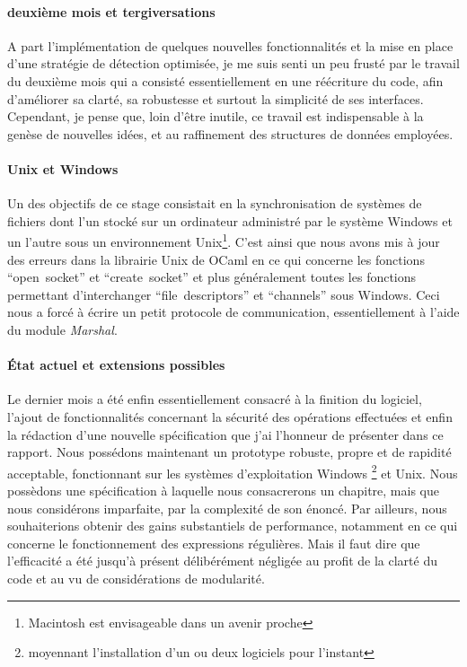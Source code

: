 \documentclass[11pt]{report}
\begin{document}
\paragraph{deuxi\`eme mois et tergiversations\\}
A part l'impl\'ementation de quelques nouvelles fonctionnalit\'es et la mise
en place d'une strat\'egie de d\'etection optimis\'ee, je me suis senti un 
peu frust\'e par le travail du deuxi\`eme mois qui
a consist\'e essentiellement en une r\'e\'ecriture du code, afin d'am\'eliorer
sa clart\'e, sa robustesse et surtout la simplicit\'e de ses interfaces.
Cependant, je pense que, loin d'\^etre inutile, ce travail est indispensable
\`a la gen\`ese de nouvelles id\'ees, et au raffinement des structures de 
donn\'ees employ\'ees.
\paragraph{Unix et Windows\\}
Un des objectifs de ce stage consistait en la synchronisation de syst\`emes de fichiers
dont l'un stock\'e sur un ordinateur administr\'e par le syst\`eme
Windows et un l'autre sous un environnement Unix\footnote{Macintosh est envisageable dans un avenir proche}.
C'est ainsi que nous avons mis \`a jour des erreurs dans la librairie Unix de
OCaml en ce qui concerne les fonctions ``open~socket'' et ``create~socket'' et
plus g\'en\'eralement toutes les  fonctions permettant d'interchanger ``file~descriptors'' et 
``channels'' sous Windows. Ceci nous a forc\'e \`a \'ecrire un petit protocole de 
communication, essentiellement \`a l'aide du module \emph{Marshal}.
\paragraph{\'Etat actuel et extensions possibles\\}
Le dernier mois a \'et\'e enfin essentiellement consacr\'e \`a la finition du
logiciel, l'ajout de fonctionnalit\'es concernant la s\'ecurit\'e des
op\'erations effectu\'ees et enfin la r\'edaction d'une nouvelle 
sp\'ecification que j'ai l'honneur de pr\'esenter dans ce rapport.
Nous poss\'edons maintenant un prototype robuste, propre et de rapidit\'e
acceptable, fonctionnant sur les syst\`emes d'exploitation Windows
\footnote{moyennant l'installation d'un ou deux logiciels pour l'instant} et 
Unix. Nous poss\`edons une sp\'ecification \`a laquelle nous consacrerons un chapitre, mais
que nous consid\'erons imparfaite, par la complexit\'e de son \'enonc\'e.
Par ailleurs, nous souhaiterions obtenir des gains substantiels de 
performance, notamment en ce qui concerne le fonctionnement des expressions 
r\'eguli\`eres. Mais il faut dire que l'efficacit\'e 
a \'et\'e jusqu'\`a pr\'esent d\'elib\'er\'ement n\'eglig\'ee au profit de 
la clart\'e du code et au vu de consid\'erations de modularit\'e.
\newpage
\end{document}
